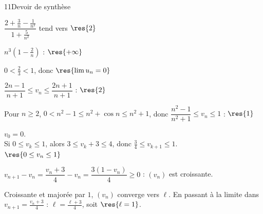 \begin{corrige}{11}{Devoir de synthèse}
\begin{deuxcolonnes}
\begin{questions}
  \item $\dfrac{2+\frac{3}{n}-\frac{1}{n^{2}}}{1+\frac{5}{n^{2}}}$ tend vers $\res{2}$
  \item $n^{3}\left(1-\frac{2}{n}\right)$ : $\res{+\infty}$
  \item $0<\frac23<1$, donc $\res{\lim u_n=0}$
\end{questions}
\begin{questions}[resume]
  \item $\dfrac{2n-1}{n+1}\leq v_n\leq\dfrac{2n+1}{n+1}$ : $\res{2}$
  \item Pour $n\geq2$, $0<n^{2}-1\leq n^{2}+\cos n\leq n^{2}+1$, donc $\dfrac{n^{2}-1}{n^{2}+1}\leq v_n\leq1$ : $\res{1}$
\end{questions}
\columnbreak
{}
\begin{questions}[resume]
  \item {} $v_0=0$.\\
     Si $0\leq v_k\leq1$, alors $3\leq v_k+3\leq4$, donc $\frac34\leq v_{k+1}\leq1$.\\
    $\res{0\leq v_n\leq1}$
  \item $v_{n+1}-v_n=\dfrac{v_n+3}{4}-v_n=\dfrac{3(1-v_n)}{4}\geq0$ : $(v_n)$ est croissante.
  \item Croissante et majorée par $1$, $(v_n)$ converge vers $\ell$. En passant à la limite dans
    $v_{n+1}=\frac{v_n+3}{4}$ : $\ell=\frac{\ell+3}{4}$, soit $\res{\ell=1}$.
\end{questions}
\end{deuxcolonnes}
\end{corrige}

